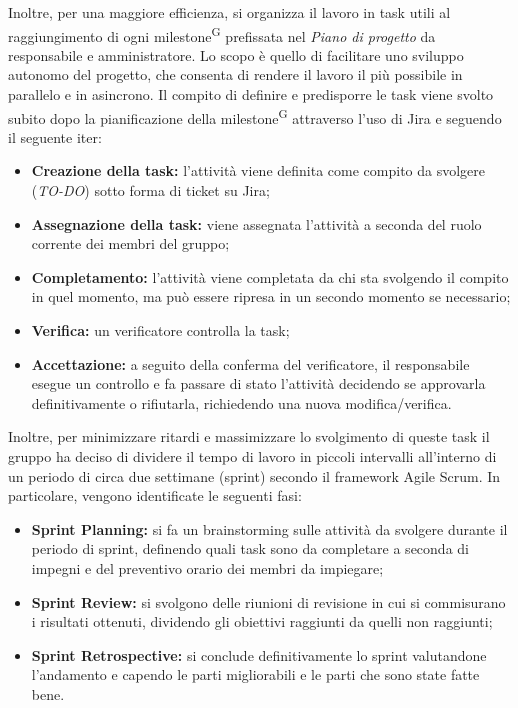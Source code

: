 Inoltre, per una maggiore efficienza, si organizza il lavoro in task utili al raggiungimento di ogni milestone\textsuperscript{G} prefissata nel \textit{Piano di progetto} da responsabile e amministratore. %
Lo scopo è quello di facilitare uno sviluppo autonomo del progetto, che consenta di rendere il lavoro il più possibile in parallelo e in asincrono.
Il compito di definire e predisporre le task viene svolto subito dopo la pianificazione della milestone\textsuperscript{G} attraverso l'uso di Jira e seguendo il seguente iter:
\begin{itemize}
    \item \textbf{Creazione della task:} l'attività viene definita come compito da svolgere (\textit{TO-DO}) sotto forma di ticket su Jira;
    \item \textbf{Assegnazione della task:} viene assegnata l'attività a seconda del ruolo corrente dei membri del gruppo;
    \item \textbf{Completamento:} l'attività viene completata da chi sta svolgendo il compito in quel momento, ma può essere ripresa in un secondo momento se necessario;
    \item \textbf{Verifica:} un verificatore controlla la task;
    \item \textbf{Accettazione:} a seguito della conferma del verificatore, il responsabile esegue un controllo e fa passare di stato l'attività decidendo se approvarla definitivamente o rifiutarla, richiedendo una nuova modifica/verifica.
\end{itemize}
Inoltre, per minimizzare ritardi e massimizzare lo svolgimento di queste task il gruppo ha deciso di dividere il tempo di lavoro in piccoli intervalli all'interno di un periodo di circa due settimane (sprint) secondo il framework Agile Scrum.
In particolare, vengono identificate le seguenti fasi:
\begin{itemize}
    \item \textbf{Sprint Planning:} si fa un brainstorming sulle attività da svolgere durante il periodo di sprint, definendo quali task sono da completare a seconda di impegni e del preventivo orario dei membri da impiegare;
    \item \textbf{Sprint Review:} si svolgono delle riunioni di revisione in cui si commisurano i risultati ottenuti, dividendo gli obiettivi raggiunti da quelli non raggiunti;
    \item \textbf{Sprint Retrospective:} si conclude definitivamente lo sprint valutandone l'andamento e capendo le parti migliorabili e le parti che sono state fatte bene.
\end{itemize}

